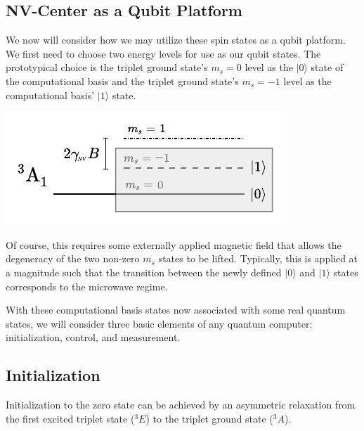\documentclass[10pt,a4paper]{article}
\begin{document}
\begin{multicols}{2}
\section{NV-Center as a Qubit Platform}
We now will consider how we may utilize these spin states as a qubit platform.
We first need to choose two energy levels for use as our qubit states. The prototypical choice is the triplet ground state's $m_s=0$ level as the $\vert 0 \rangle$ state of the computational basis and the triplet ground state's $m_s=-1$ level as the computational basis' $\vert 1 \rangle$ state.
\begin{center}
\includegraphics[scale=1.05]{energy_qubit.pdf}
\end{center} 
Of course, this requires some externally applied magnetic field that allows the degeneracy of the two non-zero $m_s$ states to be lifted. Typically, this is applied at a magnitude such that the transition between the newly defined $\vert 0 \rangle$ and $\vert 1 \rangle$ states corresponds to the microwave regime.

With these computational basis states now associated with some real quantum states, we will consider three basic elements of any quantum computer: initialization, control, and measurement.

\subsection{Initialization}
Initialization to the zero state can be achieved by an asymmetric relaxation from the first excited triplet state ($^3E$) to the triplet ground state ($^3A$). 


\end{multicols}
\end{document}
